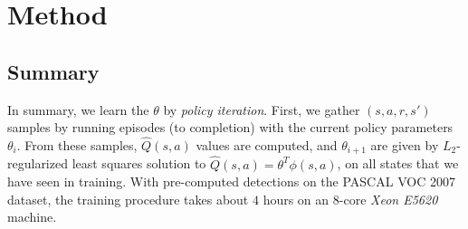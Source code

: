 \section{Method}\label{sec:det_method}







\subsection{Summary}

In summary, we learn the $\theta$ by \emph{policy iteration}.
First, we gather $(s, a, r, s')$ samples by running episodes (to completion) with the current policy parameters $\theta_i$.
From these samples, $\hat{Q}(s, a)$ values are computed, and $\theta_{i+1}$ are given by $L_2$-regularized least squares solution to $\hat{Q}(s, a) = \theta^T \phi(s, a)$, on all states that we have seen in training.
With pre-computed detections on the PASCAL VOC 2007 dataset, the training procedure takes about $4$ hours on an $8$-core \emph{Xeon E5620} machine.
